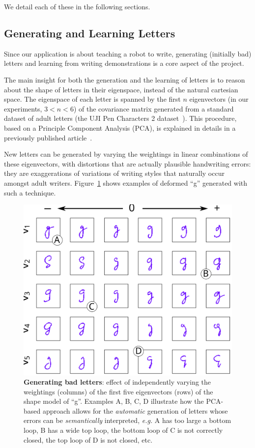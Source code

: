 \documentclass{article}
\newcommand{\eg}{\textit{e.g.}\xspace}
\begin{document}
We detail each of these in the following sections.

\subsection{Generating and Learning Letters}

Since our application is about teaching a robot to write, generating (initially
bad) letters and learning from writing demonstrations is a core aspect of the
project.

The main insight for both the generation and the learning of letters is to
reason about the shape of letters in their eigenspace, instead of the natural
cartesian space. The eigenspace of each letter is spanned by the first $n$
eigenvectors (in our experiments, $3 < n < 6$) of the covariance matrix
generated from a standard dataset of adult letters (the UJI Pen Characters 2
dataset~\cite{Llorens2008}).  This procedure, based on a Principle Component
Analysis (PCA), is explained in details in a previously published
article~\cite{hood2015when}.

New letters can be generated by varying the weightings in linear combinations of
these eigenvectors, with distortions that are actually plausible handwriting errors: 
they are exaggerations of variations of writing styles that naturally occur amongst
adult writers.  Figure~\ref{fig:sampleLetters} shows examples of deformed ``g''
generated with such a technique.

\begin{figure}
    \centering
    \includegraphics[width=0.9\linewidth]{cowriter-g}
    \caption{\small \label{fig:sampleLetters} \textbf{Generating bad letters}:
        effect of independently varying the weightings (columns) of the first five eigenvectors 
        (rows) of the shape model of ``g''. Examples A, B, C, D illustrate how the
        PCA-based approach allows for the \emph{automatic} generation of letters whose
        errors can be \emph{semantically} interpreted, \eg A has too large a bottom
        loop, B has a wide top loop, the bottom loop of C is not correctly
        closed, the top loop of D is not closed, etc.}

\end{figure}
\end{document}
